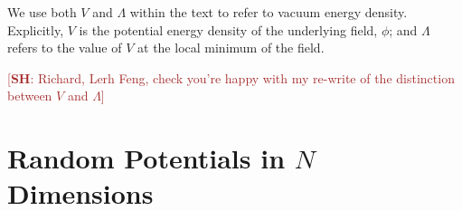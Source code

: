 \documentclass[12pt]{article}
\newcommand{\SH}[1]{\textcolor{brown}{[{\bf SH}: #1]}}
\newcommand{\sh}[1]{\textcolor{brown}{#1}}
\begin{document}
We use both $V$ and $\Lambda$ within the text to refer to vacuum energy density. Explicitly, $V$ is the potential energy density of the underlying field, $\phi$; and $\Lambda$ refers to the value of $V$ at the local minimum of the field.

 \SH{Richard, Lerh Feng, check you're happy with my re-write of the distinction between $V$ and $\Lambda$}

\section{Random Potentials in $N$ Dimensions}

\end{document}
